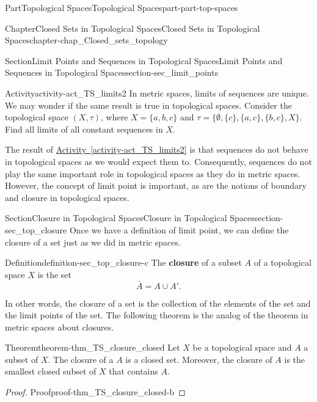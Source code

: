\documentclass[oneside,10pt,]{book}
\newcommand{\xreffont}{\relax}
\newcommand{\terminology}[1]{\textbf{#1}}
\numberwithin{equation}{chapter}
\begin{document}
\begin{partptx}{Part}{Topological Spaces}{}{Topological Spaces}{}{}{part-part-top-spaces}
\begin{chapterptx}{Chapter}{Closed Sets in Topological Spaces}{}{Closed Sets in Topological Spaces}{}{}{chapter-chap_Closed_sets_topology}
\begin{sectionptx}{Section}{Limit Points and Sequences in Topological Spaces}{}{Limit Points and Sequences in Topological Spaces}{}{}{section-sec_limit_points}
\begin{activity}{Activity}{}{activity-act_TS_limits2}
In metric spaces, limits of sequences are unique. We may wonder if the same result is true in topological spaces. Consider the topological space \((X,\tau)\), where \(X = \{a, b, c\}\) and \(\tau = \{\emptyset, \{c\}, \{a, c\}, \{b, c\}, X\}\). Find all limits of all constant sequences in \(X\).%
\end{activity}%
The result of \hyperref[activity-act_TS_limits2]{Activity~{\xreffont\ref{activity-act_TS_limits2}}} is that sequences do not behave in topological spaces as we would expect them to. Consequently, sequences do not play the same important role in topological spaces as they do in metric spaces. However, the concept of limit point is important, as are the notions of boundary and closure in topological spaces.%
\end{sectionptx}
%
%
\typeout{************************************************}
\typeout{************************************************}
%
\begin{sectionptx}{Section}{Closure in Topological Spaces}{}{Closure in Topological Spaces}{}{}{section-sec_top_closure}
Once we have a definition of limit point, we can define the closure of a set just as we did in metric spaces.%
\begin{definition}{Definition}{}{definition-sec_top_closure-c}%
%
The \terminology{closure} of a subset \(A\) of a topological space \(X\) is the set%
\begin{equation*}
\overline{A} = A \cup A'\text{.}
\end{equation*}
%
\end{definition}
In other words, the closure of a set is the collection of the elements of the set and the limit points of the set. The following theorem is the analog of the theorem in metric spaces about closures.%
\begin{theorem}{Theorem}{}{}{theorem-thm_TS_closure_closed}%
Let \(X\) be a topological space and \(A\) a subset of \(X\). The closure of a \(A\) is a closed set. Moreover, the closure of \(A\) is the smallest closed subset of \(X\) that contains \(A\).%
\end{theorem}
\begin{proof}{Proof}{}{proof-thm_TS_closure_closed-b}

\end{proof}
\end{sectionptx}
\end{chapterptx}
\end{partptx}
\end{document}
